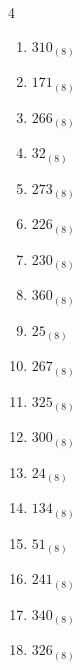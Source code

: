 \begin{multicols}{4}
\begin{enumerate}
  \item $310_{(8)}$

        \phantom{$=200$}

  \item $171_{(8)}$

        \phantom{$=121$}

  \item $266_{(8)}$

        \phantom{$=182$}

\columnbreak %

  \item $32_{(8)}$

        \phantom{$=26$}

  \item $273_{(8)}$

        \phantom{$=187$}

  \item $226_{(8)}$

        \phantom{$=150$}

  \item $230_{(8)}$

        \phantom{$=152$}

  \item $360_{(8)}$

        \phantom{$=240$}

  \item $25_{(8)}$

        \phantom{$=21$}

  \item $267_{(8)}$

        \phantom{$=183$}

  \item $325_{(8)}$

        \phantom{$=213$}

  \item $300_{(8)}$

        \phantom{$=192$}

  \item $24_{(8)}$

        \phantom{$=20$}

  \item $134_{(8)}$

        \phantom{$=92$}

  \item $51_{(8)}$

        \phantom{$=41$}

  \item $241_{(8)}$

        \phantom{$=161$}

  \item $340_{(8)}$

        \phantom{$=224$}

  \item $326_{(8)}$

        \phantom{$=214$}

\end{enumerate}
\end{multicols}

